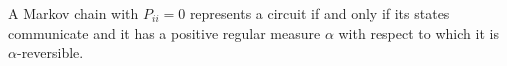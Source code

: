 A Markov chain with $P_{ii} = 0$ represents a circuit if and only if its states communicate and it has a positive regular measure $\alpha$ with respect to which it is $\alpha$-reversible.
